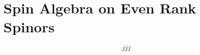 \chapter{Spin Algebra on Even Rank Spinors}
\label{apx:SpinorOp}

\begin{equation}
jjj
\end{equation}
